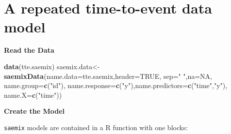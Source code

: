 \documentclass[]{book}
\newenvironment{Shaded}{\begin{snugshade}}{\end{snugshade}}
\newcommand{\KeywordTok}[1]{\textcolor[rgb]{0.13,0.29,0.53}{\textbf{{#1}}}}
\newcommand{\DataTypeTok}[1]{\textcolor[rgb]{0.13,0.29,0.53}{{#1}}}
\newcommand{\StringTok}[1]{\textcolor[rgb]{0.31,0.60,0.02}{{#1}}}
\newcommand{\OtherTok}[1]{\textcolor[rgb]{0.56,0.35,0.01}{{#1}}}
\newcommand{\NormalTok}[1]{{#1}}
\begin{document}
\section{A repeated time-to-event data
model}\label{a-repeated-time-to-event-data-model}

\textbf{Read the Data}

\begin{Shaded}
\begin{Highlighting}[]
\KeywordTok{data}\NormalTok{(tte.saemix)}
\NormalTok{saemix.data<-}\KeywordTok{saemixData}\NormalTok{(}\DataTypeTok{name.data=}\NormalTok{tte.saemix,}\DataTypeTok{header=}\OtherTok{TRUE}\NormalTok{,}
  \DataTypeTok{sep=}\StringTok{" "}\NormalTok{,}\DataTypeTok{na=}\OtherTok{NA}\NormalTok{, }\DataTypeTok{name.group=}\KeywordTok{c}\NormalTok{(}\StringTok{"id"}\NormalTok{),}
  \DataTypeTok{name.response=}\KeywordTok{c}\NormalTok{(}\StringTok{"y"}\NormalTok{),}\DataTypeTok{name.predictors=}\KeywordTok{c}\NormalTok{(}\StringTok{"time"}\NormalTok{,}\StringTok{"y"}\NormalTok{),}
  \DataTypeTok{name.X=}\KeywordTok{c}\NormalTok{(}\StringTok{"time"}\NormalTok{))}
\end{Highlighting}
\end{Shaded}

\textbf{Create the Model}

\texttt{saemix} models are contained in a R function with one blocks:
\end{document}
